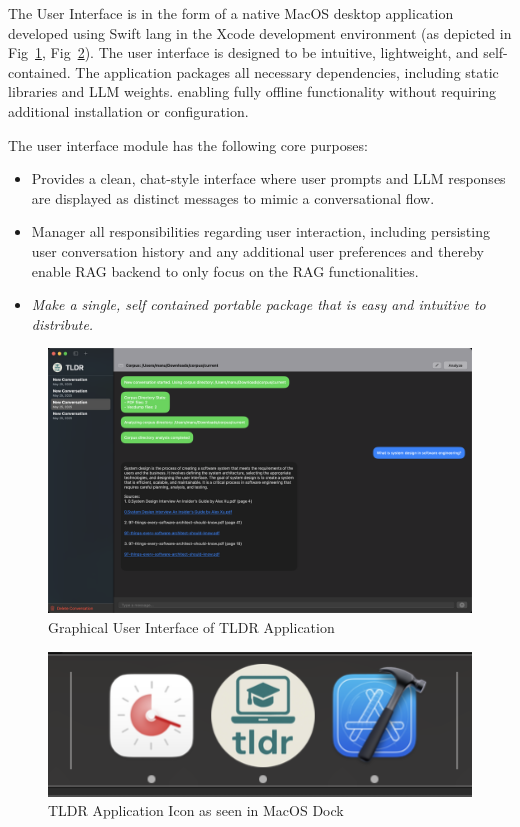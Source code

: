 The User Interface is in the form of a native MacOS desktop application developed using Swift lang in the Xcode development environment (as depicted in Fig~\ref{fig:tldrGUI}, Fig~\ref{fig:tldrdockicon}). The user interface is designed to be intuitive, lightweight, and self-contained. The application packages all necessary dependencies, including static libraries and LLM weights. enabling fully offline functionality without requiring additional installation or configuration.

The user interface module has the following core purposes:
\begin{itemize}
    \item Provides a clean, chat-style interface where user prompts and LLM responses are displayed as distinct messages to mimic a conversational flow.
    \item Manager all responsibilities regarding user interaction, including persisting user conversation history and any additional user preferences and thereby enable RAG backend to only focus on the RAG functionalities.
    \item \textit{Make a single, self contained portable package that is easy and intuitive to distribute.}
\end{itemize}
\begin{figure}[H]
    \centering
    \includegraphics[width=1.0\linewidth]{images/tldr-ui-window.png}
    \caption{Graphical User Interface of TLDR Application}
    \label{fig:tldrGUI}
\end{figure}
\begin{figure}[H]
    \centering
    \includegraphics[width=0.65\linewidth]{images/tldr-dock-icon.png}
    \caption{TLDR Application Icon as seen in MacOS Dock}
    \label{fig:tldrdockicon}
\end{figure}
